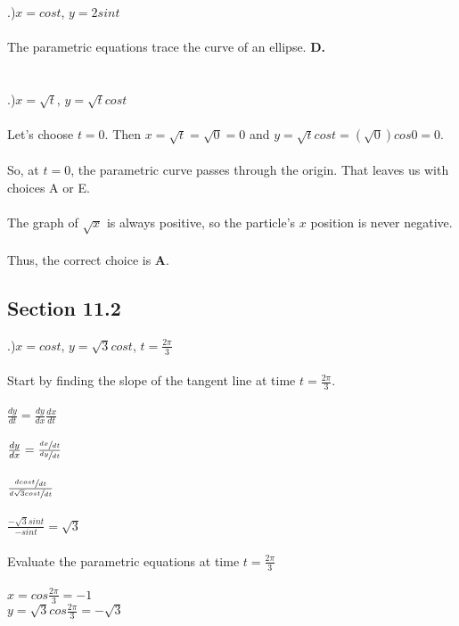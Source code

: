 \documentclass[12pt]{article}
\begin{document}
.)$x = cos{t}$, \hspace{10pt} $y=2sin{t}$\\\\
The parametric equations trace the curve of an ellipse. \textbf{D.}\\\\\\
.)$x = \sqrt{t}$, \hspace{10pt} $y=\sqrt{t}cos{t}$\\\\
Let's choose $t=0$. Then $x = \sqrt{t} = \sqrt{0} = 0$ and $y = \sqrt{t}cos{t} = (\sqrt{0})cos{0} = 0$.\\\\
So, at $t=0$, the parametric curve passes through the origin. That leaves us with choices A or E.\\\\
The graph of $\sqrt{x}$ is always positive, so the particle's $x$ position is never negative.\\\\
Thus, the correct choice is \textbf{A}.\pagebreak

\subsection*{Section 11.2}
.)$x=cos{t}$, \hspace{10pt} $y=\sqrt{3}cos{t}$, \hspace{10pt} $t=\frac{2\pi}{3}$\\\\
Start by finding the slope of the tangent line at time $t=\frac{2\pi}{3}$.\\\\
$\frac{dy}{dt} = \frac{dy}{dx}\frac{dx}{dt}$\\\\
$\frac{dy}{dx} = \frac{\sfrac{dx}{dt}}{\sfrac{dy}{dt}}$\\\\
$\frac{\sfrac{dcos{t}}{dt}}{\sfrac{d\sqrt{3}cos{t}}{dt}}$\\\\
$\frac{-\sqrt{3}sin{t}}{-sin{t}} = \sqrt{3}$\\\\
Evaluate the parametric equations at time $t=\frac{2\pi}{3}$\\\\
$x=cos{\frac{2\pi}{3}} = -1$\\
$y=\sqrt{3}cos{\frac{2\pi}{3}} = -\sqrt{3}$\\\\
\end{document}
